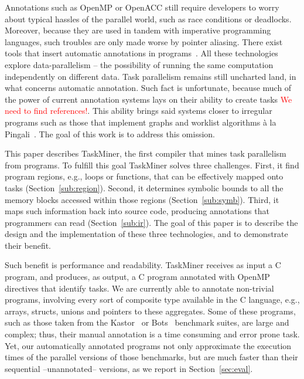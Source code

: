 \documentclass[sigplan,10pt,review,anonymous]{acmart}
\newcommand{\ed}[1]{\noindent\textcolor{red}{ {#1}}}
\newcommand{\ed}[1]{}
\newcommand\Taskminer{\mbox{\textsf{TaskMiner}}}
\begin{document}
Annotations such as OpenMP or OpenACC still require developers to
worry about typical hassles of the parallel world, such as race conditions
or deadlocks.
Moreover, because they are used in tandem with imperative programming languages,
such troubles are only made worse by pointer aliasing.
There exist tools that insert automatic annotations in
programs~\cite{Mendonca16,Pingali11,Nugteren14}.
All these technologies explore data-parallelism -- the possibility of running
the same computation independently on different data.
Task parallelism remains still uncharted land, in what concerns automatic
annotation.
Such fact is unfortunate, because much of the power of current annotation
systems lays on their ability to create tasks \ed{We need to find references!}.
This ability brings said systems closer to irregular programs such as those
that implement graphs and worklist algorithms \`{a} la
Pingali~\cite{Ben-Nun17,Kulkarni11,Pingali11}.
The goal of this work is to address this omission.

This paper describes \Taskminer, the first compiler that mines task parallelism
from programs.
To fulfill this goal \Taskminer{} solves three challenges.
First, it find program regions, e.g., loops or functions, that can be
effectively mapped onto tasks (Section~\ref{sub:region}).
Second, it determines symbolic bounds to all the memory blocks accessed within
those regions (Section~\ref{sub:symb}).
Third, it maps such information back into source code, producing annotations
that programmers can read (Section~\ref{sub:ir}).
The goal of this paper is to describe the design and the implementation of these
three technologies, and to demonstrate their benefit.

Such benefit is performance and readability.
\Taskminer{} receives as input a C program, and produces, as output, a C
program annotated with OpenMP directives that identify tasks.
We are currently able to annotate non-trivial programs, involving every
sort of composite type available in the C language, e.g., arrays, structs,
unions and pointers to these aggregates.
Some of these programs, such as those taken from the
Kastor~\cite{Virouleau14} or Bots~\cite{Duran09}
benchmark suites, are large and complex; thus, their manual annotation is a
time consuming and error prone task.
Yet, our automatically annotated programs not only approximate the execution
times of the parallel versions of those benchmarks, but are much faster than
their sequential --unannotated-- versions, as we report in Section~\ref{sec:eval}.
\end{document}
